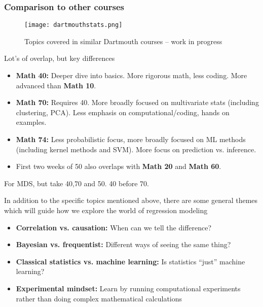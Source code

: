 \documentclass[serif,mathserif]{beamer}
\begin{document}
\begin{frame}
\frametitle{Comparison to other courses}


\begin{figure}
        \centering
        \texttt{[image: dartmouthstats.png]}
        \caption{Topics covered in similar Dartmouth courses --  work in progress}
\end{figure}
    
 \pause

    


\end{frame}

\begin{frame}


Lot's of overlap, but key differences 
\begin{itemize}
\item {\bf Math 40:} Deeper dive into basics. More rigorous math, less coding. More advanced than {\bf Math 10}. 
\item {\bf Math 70:} Requires 40. More broadly focused on multivariate stats (including clustering, PCA). Less emphasis on computational/coding, hands on examples.  
\item {\bf Math 74:} Less probabilistic focus, more broadly focused on ML methods (including kernel methods and SVM). More focus on prediction vs. inference. 
\item First two weeks of 50 also overlaps with {\bf Math 20} and {\bf Math 60}. 
\end{itemize}

\pause
For MDS, but take 40,70 and 50. 40 before 70. 



\end{frame}


\begin{frame}

In addition to the specific topics mentioned above, there are some general themes which will guide how we explore the world of regression modeling
\begin{itemize}
\item {\bf Correlation vs. causation:} When can we tell the difference? 
\item {\bf Bayesian vs. frequentist:} Different ways of seeing the same thing?  
\item {\bf Classical statistics vs. machine learning:} Is statistics ``just'' machine learning? 
\item {\bf Experimental mindset:}  Learn by running computational experiments rather than doing complex mathematical calculations 
\end{itemize}


\end{frame}
\end{document}

